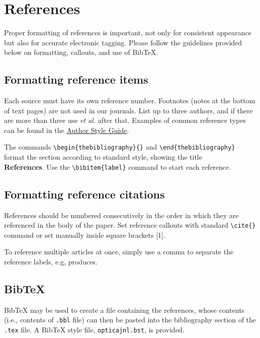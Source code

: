 \documentclass{optica-article}
\begin{document}
\section{References}
\label{sec:refs}
Proper formatting of references is important, not only for consistent appearance but also for accurate electronic tagging. Please follow the guidelines provided below on formatting, callouts, and use of Bib\TeX.

\subsection{Formatting reference items}
Each source must have its own reference number. Footnotes (notes at the bottom of text pages) are not used in our journals. List up to three authors, and if there are more than three use \emph{et al.} after that. Examples of common reference types can be found in the  \href{https://opg.optica.org/jot/submit/style/oestyleguide.cfm} {Author Style Guide}.


The commands \verb+\begin{thebibliography}{}+ and \verb+\end{thebibliography}+ format the section according to standard style, showing the title\\
{\bfseries References}.  Use the \verb+\bibitem{label}+ command to start each reference.

\subsection{Formatting reference citations}
References should be numbered consecutively in the order in which they are referenced in the body of the paper. Set reference callouts with standard \verb+\cite{}+ command or set manually inside square brackets [1].

To reference multiple articles at once, simply use a comma to separate the reference labels, e.g, produces.

\subsection{Bib\TeX}
\label{sec:bibtex}
Bib\TeX{} may be used to create a file containing the references, whose contents (i.e., contents of \texttt{.bbl} file) can then be pasted into the bibliography section of the \texttt{.tex} file. A Bib\TeX{} style file, \texttt{opticajnl.bst}, is provided.
\end{document}
